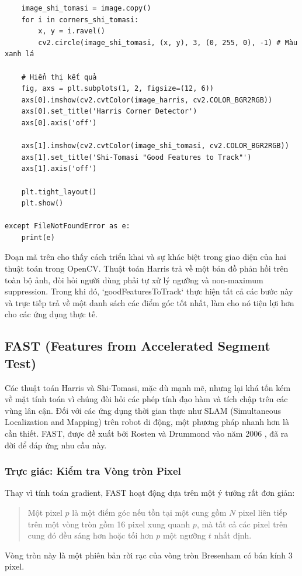 \begin{verbatim}
    image_shi_tomasi = image.copy()
    for i in corners_shi_tomasi:
        x, y = i.ravel()
        cv2.circle(image_shi_tomasi, (x, y), 3, (0, 255, 0), -1) # Màu xanh lá

    # Hiển thị kết quả
    fig, axs = plt.subplots(1, 2, figsize=(12, 6))
    axs[0].imshow(cv2.cvtColor(image_harris, cv2.COLOR_BGR2RGB))
    axs[0].set_title('Harris Corner Detector')
    axs[0].axis('off')
    
    axs[1].imshow(cv2.cvtColor(image_shi_tomasi, cv2.COLOR_BGR2RGB))
    axs[1].set_title('Shi-Tomasi "Good Features to Track"')
    axs[1].axis('off')
    
    plt.tight_layout()
    plt.show()

except FileNotFoundError as e:
    print(e)
\end{verbatim}

Đoạn mã trên cho thấy cách triển khai và sự khác biệt trong giao diện của hai thuật toán trong OpenCV. Thuật toán Harris trả về một bản đồ phản hồi trên toàn bộ ảnh, đòi hỏi người dùng phải tự xử lý ngưỡng và non-maximum suppression. Trong khi đó, `goodFeaturesToTrack` thực hiện tất cả các bước này và trực tiếp trả về một danh sách các điểm góc tốt nhất, làm cho nó tiện lợi hơn cho các ứng dụng thực tế.

\subsection{FAST (Features from Accelerated Segment Test)}
\label{subsec:fast_detector}

Các thuật toán Harris và Shi-Tomasi, mặc dù mạnh mẽ, nhưng lại khá tốn kém về mặt tính toán vì chúng đòi hỏi các phép tính đạo hàm và tích chập trên các vùng lân cận. Đối với các ứng dụng thời gian thực như SLAM (Simultaneous Localization and Mapping) trên robot di động, một phương pháp nhanh hơn là cần thiết. FAST, được đề xuất bởi Rosten và Drummond vào năm 2006 \cite{Rosten2006}, đã ra đời để đáp ứng nhu cầu này.

\subsubsection{Trực giác: Kiểm tra Vòng tròn Pixel}
\label{subsubsec:fast_intuition}
Thay vì tính toán gradient, FAST hoạt động dựa trên một ý tưởng rất đơn giản:
\begin{quote}
    Một pixel $p$ là một điểm góc nếu tồn tại một cung gồm $N$ pixel liên tiếp trên một vòng tròn gồm 16 pixel xung quanh $p$, mà tất cả các pixel trên cung đó đều sáng hơn hoặc tối hơn $p$ một ngưỡng $t$ nhất định.
\end{quote}
Vòng tròn này là một phiên bản rời rạc của vòng tròn Bresenham có bán kính 3 pixel.

